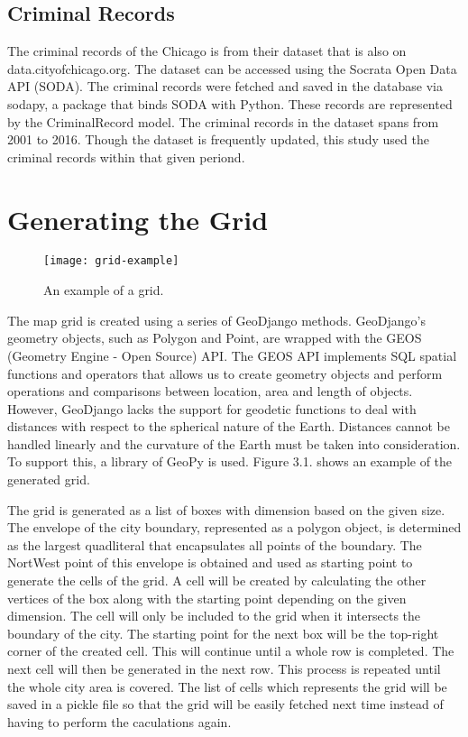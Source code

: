     \subsection{Criminal Records}
        The criminal records of the Chicago is from their dataset that is also on data.cityofchicago.org. The dataset can be accessed using the Socrata Open Data API (SODA). The criminal records were fetched and saved in the database via sodapy, a package that binds SODA with Python. These records are represented by the CriminalRecord model. The criminal records in the dataset spans from 2001 to 2016. Though the dataset is frequently updated, this study used the criminal records within that given periond.

\section{Generating the Grid}
    \begin{figure}[h]
    \centering
    \texttt{[image: grid-example]}
    \caption{An example of a grid.}
    \end{figure}
    The map grid is created using a series of GeoDjango methods. GeoDjango's geometry objects, such as Polygon and Point, are wrapped with the GEOS (Geometry Engine - Open Source) API. The GEOS API implements SQL spatial functions and operators that allows us to create geometry objects and perform operations and comparisons between location, area and length of objects. However, GeoDjango lacks the support for geodetic functions to deal with distances with respect to the spherical nature of the Earth. Distances cannot be handled linearly and the curvature of the Earth must be taken into consideration. To support this, a library of GeoPy is used. Figure 3.1. shows an example of the generated grid.

    The grid is generated as a list of boxes with dimension based on the given size. The envelope of the city boundary, represented as a polygon object, is determined as the largest quadliteral that encapsulates all points of the boundary. The NortWest point of this envelope is obtained and used as starting point to generate the cells of the grid. A cell will be created by calculating the other vertices of the box along with the starting point depending on the given dimension. The cell will only be included to the grid when it intersects the boundary of the city. The starting point for the next box will be the top-right corner of the created cell. This will continue until a whole row is completed. The next cell will then be generated in the next row. This process is repeated until the whole city area is covered. The list of cells which represents the grid will be saved in a pickle file so that the grid will be easily fetched next time instead of having to perform the caculations again.

